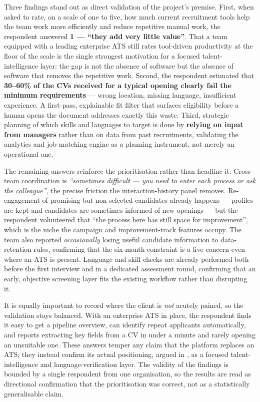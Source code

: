 Three findings stand out as direct validation of the project's premise.
First, when asked to rate, on a scale of one to five, how much current
recruitment tools help the team work more efficiently and reduce repetitive
manual work, the respondent answered \textbf{1 --- ``they add very little
value''}. That a team equipped with a leading enterprise ATS still rates
tool-driven productivity at the floor of the scale is the single strongest
motivation for a focused talent-intelligence layer: the gap is not the
absence of software but the absence of software that removes the repetitive
work. Second, the respondent estimated that \textbf{30--60\% of the CVs
received for a typical opening clearly fail the minimum requirements} ---
wrong location, missing language, insufficient experience. A first-pass,
explainable fit filter that surfaces eligibility before a human opens the
document addresses exactly this waste. Third, strategic planning of which
skills and languages to target is done by \textbf{relying on input from
managers} rather than on data from past recruitments, validating the
analytics and job-matching engine as a planning instrument, not merely an
operational one.

The remaining answers reinforce the prioritisation rather than headline it.
Cross-team coordination is \textit{``sometimes difficult --- you need to
enter each process or ask the colleague''}, the precise friction the
interaction-history panel removes. Re-engagement of promising but
non-selected candidates already happens --- profiles are kept and candidates
are sometimes informed of new openings --- but the respondent volunteered
that ``the process here has still space for improvement'', which is the
niche the campaign and improvement-track features occupy. The team also
reported \textit{occasionally} losing useful candidate information to
data-retention rules, confirming that the six-month constraint is a live
concern even where an ATS is present. Language and skill checks are already
performed both before the first interview and in a dedicated assessment
round, confirming that an early, objective screening layer fits the existing
workflow rather than disrupting it.

It is equally important to record where the client is \emph{not} acutely
pained, so the validation stays balanced. With an enterprise ATS in place,
the respondent finds it easy to get a pipeline overview, can identify repeat
applicants automatically, and reports extracting key fields from a CV in
under a minute and rarely opening an unsuitable one. These answers temper any
claim that the platform replaces an ATS; they instead confirm its actual
positioning, argued in , as a focused
talent-intelligence and language-verification layer. The validity of the
findings is bounded by a single respondent from one organisation, so the
results are read as directional confirmation that the prioritisation was
correct, not as a statistically generalisable claim.

